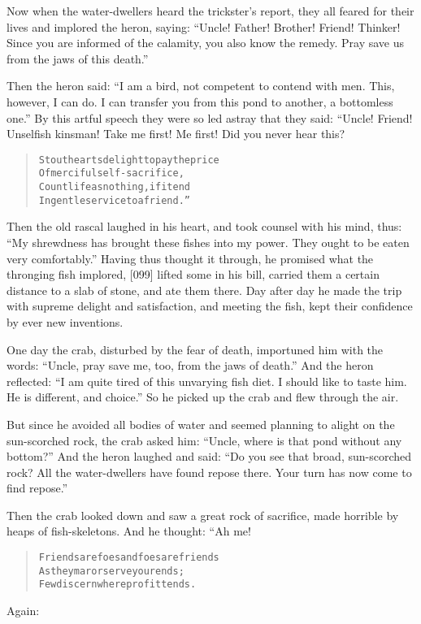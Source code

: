 \documentclass[article, twoside, 14pt]{memoir}
\renewenvironment{verbatim}{%
\begin{quote}%
\vskip -10pt%
\begin{alltt}\normalfont\large}{\end{alltt}%
\end{quote}%
\vskip -10pt
} %
\begin{document}
Now when the water-dwellers heard the trickster's report, they all
feared for their lives and implored the heron, saying:
``Uncle! Father! Brother! Friend! Thinker! Since you are informed of the calamity, you also know the remedy. Pray save us from the jaws of this death.''

Then the heron said:
``I am a bird, not competent to contend with men. This, however, I can do. I can transfer you from this pond to another, a bottomless one.''
By this artful speech they were so led astray that they said:
“Uncle! Friend! Unselfish kinsman! Take me first! Me first! Did you
never hear this?

\begin{verbatim}
Stout hearts delight to pay the price
Of merciful self-sacrifice,
Count life as nothing, if it end
In gentle service to a friend.”
\end{verbatim}
Then the old rascal laughed in his heart, and took counsel with his
mind, thus:
``My shrewdness has brought these fishes into my power. They ought to be eaten very comfortably.''
Having thus thought it through, he promised what the thronging fish
implored, [099] lifted some in his bill, carried them a certain
distance to a slab of stone, and ate them there. Day after day he
made the trip with supreme delight and satisfaction, and meeting
the fish, kept their confidence by ever new inventions.

One day the crab, disturbed by the fear of death, importuned him
with the words:
``Uncle, pray save me, too, from the jaws of death.'' And the heron
reflected:
``I am quite tired of this unvarying fish diet. I should like to taste him. He is different, and choice.''
So he picked up the crab and flew through the air.

But since he avoided all bodies of water and seemed planning to
alight on the sun-scorched rock, the crab asked him:
``Uncle, where is that pond without any bottom?'' And the heron
laughed and said:
``Do you see that broad, sun-scorched rock? All the water-dwellers have found repose there. Your turn has now come to find repose.''

Then the crab looked down and saw a great rock of sacrifice, made
horrible by heaps of fish-skeletons. And he thought: “Ah me!

\begin{verbatim}
Friends are foes and foes are friends
As they mar or serve your ends;
Few discern where profit tends.
\end{verbatim}
Again:
\end{document}
